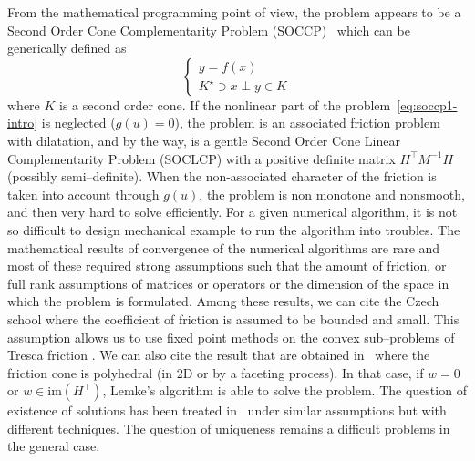 From the mathematical programming point of view, the problem appears to be a Second Order Cone Complementarity Problem (SOCCP)~\cite{Facchinei.Pang2003} which can be generically defined as
\begin{equation}
  \begin{cases}
    y =f(x) \\
    K^\star \ni x \perp y \in K
  \end{cases}
\end{equation}
where $K$ is a second order cone. If the nonlinear part of the problem~\eqref{eq:soccp1-intro} is neglected ($g(u)=0$), the problem is an associated friction problem with dilatation, and by the way, is a gentle Second Order Cone Linear Complementarity Problem (SOCLCP) with a positive definite matrix $H^\top M^{-1} H$ (possibly semi--definite).
When the non-associated character of the friction is taken into account through $g(u)$, the problem is non monotone and nonsmooth, and then very hard to solve efficiently. For a given numerical algorithm, it is not so difficult to design mechanical example to run the algorithm into troubles. The mathematical results of convergence of the numerical algorithms are rare and most of these required strong assumptions such that  the amount of friction, or full rank assumptions of matrices or operators or the dimension of the space in which the problem is formulated. Among these results, we can cite the Czech school where the coefficient of friction is assumed to be bounded and small. This assumption allows us to use fixed point methods on the convex sub--problems of Tresca friction . We can also cite the result that are obtained in~\cite{Pang.Trinkle1996,Stewart.Trinkle1996,Anitescu.Potra97} where the friction cone is polyhedral (in 2D or by a faceting process). In that case, if $w=0$ or $w \in \mathrm{im}(H^\top)$, Lemke's algorithm is able to solve the problem. The question of existence of solutions has been treated in~\cite{Klarbring.Pang1998,Acary.ea_ZAMM2011} under similar assumptions but with different techniques. The question of uniqueness remains a difficult problems in the general case.


